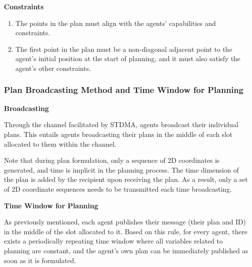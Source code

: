 \textbf{Constraints}

\begin{enumerate}
    \item The points in the plan must align with the agents' capabilities and constraints.
    \item The first point in the plan must be a non-diagonal adjacent point to the agent's initial position at the start of planning, and it must also satisfy the agent's other constraints.
\end{enumerate}


\subsubsection{Plan Broadcasting Method and Time Window for Planning}

\textbf{Broadcasting}

Through the channel facilitated by STDMA, agents broadcast their individual plans. This entails agents broadcasting their plans in the middle of each slot allocated to them within the channel.

Note that during plan formulation, only a sequence of 2D coordinates is generated, and time is implicit in the planning process. The time dimension of the plan is added by the recipient upon receiving the plan.
As a result, only a set of 2D coordinate sequences needs to be transmitted each time broadcasting.



\textbf{Time Window for Planning}

As previously mentioned, each agent publishes their message (their plan and ID) in the middle of the slot allocated to it.
Based on this rule, for every agent, there exists a periodically repeating time window where all variables related to planning are constant, 
and the agent's own plan can be immediately published as soon as it is formulated.

